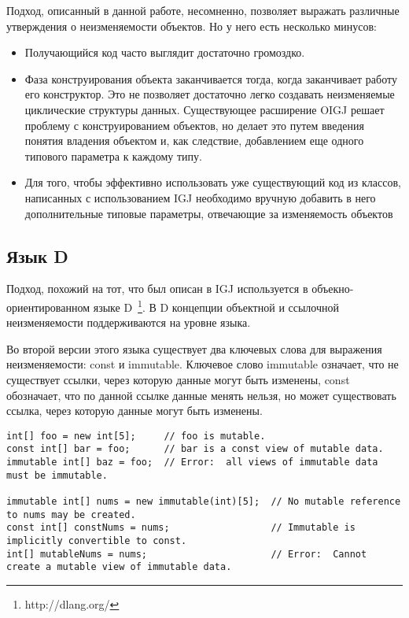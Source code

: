 Подход, описанный в данной работе, несомненно, позволяет выражать различные утверждения о неизменяемости объектов. Но у него есть несколько минусов:
\begin{itemize}
\item Получающийся код часто выглядит достаточно громоздко.
\item Фаза конструирования объекта заканчивается тогда, когда заканчивает работу его конструктор. Это не позволяет достаточно легко создавать неизменяемые циклические структуры данных. Существующее расширение OIGJ \cite{Potanin} решает проблему с конструированием объектов, но делает это путем введения понятия владения объектом и, как следствие, добавлением еще одного типового параметра к каждому типу. 
\item Для того, чтобы эффективно использовать уже существующий код из классов, написанных с использованием IGJ необходимо вручную добавить в него дополнительные типовые параметры, отвечающие за изменяемость объектов
\end{itemize}

\subsection{Язык D}

Подход, похожий на тот, что был описан в IGJ используется в объекно-ориентированном языке D~\footnote{http://dlang.org/}. В D концепции объектной и ссылочной неизменяемости поддерживаются на уровне языка.

Во второй версии этого языка существует два ключевых слова для выражения неизменяемости: const и immutable. Ключевое слово immutable означает, что не существует ссылки, через которую данные могут быть изменены, const обозначает, что по данной ссылке данные менять нельзя, но может существовать ссылка, через которую данные могут быть изменены. 

\begin{lstlisting}[caption=const vs immutable, label=code:d_const_vs_immutable]
int[] foo = new int[5];     // foo is mutable.
const int[] bar = foo;      // bar is a const view of mutable data.
immutable int[] baz = foo;  // Error:  all views of immutable data must be immutable.
 
immutable int[] nums = new immutable(int)[5];  // No mutable reference to nums may be created.
const int[] constNums = nums;                  // Immutable is implicitly convertible to const.
int[] mutableNums = nums;                      // Error:  Cannot create a mutable view of immutable data.
\end{lstlisting}

